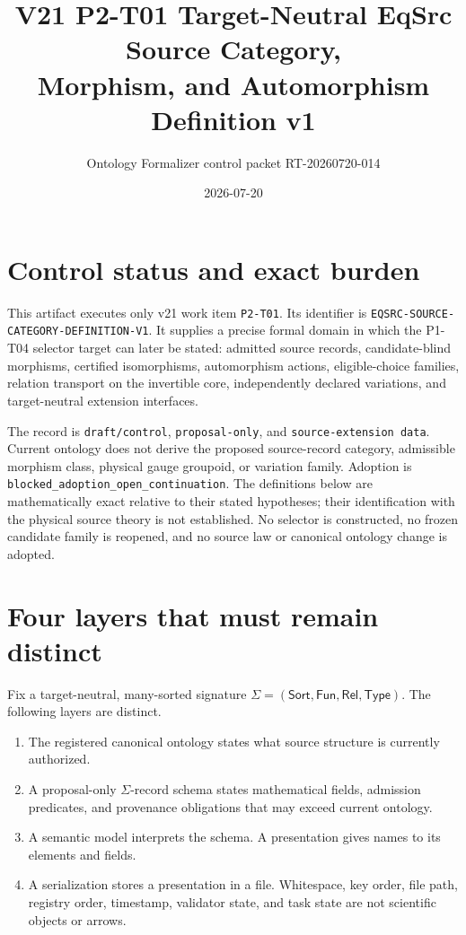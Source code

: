 \documentclass[11pt]{article}
\title{V21 P2-T01 Target-Neutral EqSrc Source Category,\\
Morphism, and Automorphism Definition v1}
\author{Ontology Formalizer control packet RT-20260720-014}
\date{2026-07-20}
\begin{document}
\maketitle

\section{Control status and exact burden}

This artifact executes only v21 work item \texttt{P2-T01}. Its identifier is
\texttt{EQSRC-SOURCE-CATEGORY-DEFINITION-V1}. It supplies a precise formal
domain in which the P1-T04 selector target can later be stated: admitted
source records, candidate-blind morphisms, certified isomorphisms,
automorphism actions, eligible-choice families, relation transport on the
invertible core, independently declared variations, and target-neutral
extension interfaces.

The record is \texttt{draft/control}, \texttt{proposal-only}, and
\texttt{source-extension data}. Current ontology does not derive the proposed
source-record category, admissible morphism class, physical gauge groupoid,
or variation family. Adoption is
\texttt{blocked\_adoption\_open\_continuation}. The definitions below are
mathematically exact relative to their stated hypotheses; their identification
with the physical source theory is not established. No selector is
constructed, no frozen candidate family is reopened, and no source law or
canonical ontology change is adopted.

\section{Four layers that must remain distinct}

Fix a target-neutral, many-sorted signature
\(\Sigma=(\mathsf{Sort},\mathsf{Fun},\mathsf{Rel},\mathsf{Type})\). The
following layers are distinct.

\begin{enumerate}[label=(L\arabic*)]
  \item The registered canonical ontology states what source structure is
  currently authorized.
  \item A proposal-only \(\Sigma\)-record schema states mathematical fields,
  admission predicates, and provenance obligations that may exceed current
  ontology.
  \item A semantic model interprets the schema. A presentation gives names to
  its elements and fields.
  \item A serialization stores a presentation in a file. Whitespace, key
  order, file path, registry order, timestamp, validator state, and task state
  are not scientific objects or arrows.
\end{enumerate}
\end{document}
